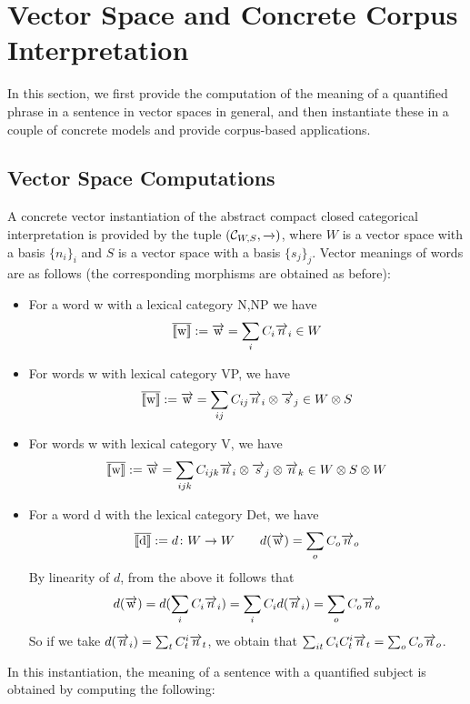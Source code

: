 \section{Vector Space and Concrete Corpus  Interpretation}


In this section, we first provide the computation of the meaning of a quantified phrase in a sentence in vector spaces in general, and then instantiate these in a couple of concrete models and provide corpus-based applications. 

\subsection{Vector Space Computations}

A concrete vector instantiation of the abstract compact closed categorical interpretation is  provided by the tuple $({\cal C}_{W,S}, \overrightarrow{\text{\ }})$, where $W$ is a vector space with a basis $\{n_i\}_i$ and $S$ is a vector space with a basis $\{s_j\}_j$.  Vector meanings of words are as follows (the corresponding morphisms are obtained as before): 
\begin{itemize}
\item For a word w with a lexical category N,NP we have  
\[
\overline{[\![ \text{w} ]\!]} := \overrightarrow{\text{w}} = \sum_i C_i \overrightarrow{n}_i \in W
\]
\item For words w with lexical category VP, we have
\[
\overline{[\![ \text{w} ]\!]} := \overrightarrow{\text{w}} = \sum_{ij} C_{ij} \overrightarrow{n}_i \otimes \overrightarrow{s}_j \in  W \otimes S
\]
\item For words w with lexical category V, we have
\[
\overline{[\![ \text{w} ]\!]} := \overrightarrow{\text{w}} =  \sum_{ijk} C_{ijk} \overrightarrow{n}_i \otimes \overrightarrow{s}_j \otimes \overrightarrow{n}_k \in W \otimes S \otimes W
\]
\item For a word d with the lexical category Det, we have 
\[
\overline{[\![ \text{d} ]\!]} := d \colon W \to W \qquad d(\overrightarrow{\text {w}})  = \sum_o C_o \overrightarrow{n}_o
\]
By linearity of $d$, from the above it follows that 
\[
d(\overrightarrow{\text {w}})  =  d(\sum_i  C_i \overrightarrow{n}_i) = \sum_i C_i d(\overrightarrow{n}_i) = \sum_o C_o \overrightarrow{n}_o
\]
So if we take $d(\overrightarrow{n}_i) = \sum_t C^i_t \overrightarrow{n}_t$, we obtain  that $\sum_{it} C_i C^i_t \overrightarrow{n}_t =  \sum_o C_o \overrightarrow{n}_o$. 
\end{itemize}

\noindent
In this instantiation, the  meaning of  a sentence with a quantified subject  is obtained by computing the following:

